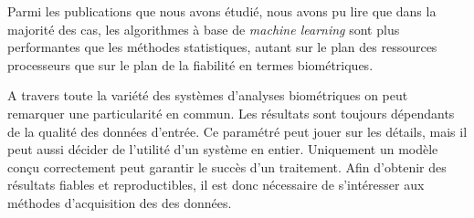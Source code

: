 Parmi les publications que nous avons étudié, nous avons pu lire que dans la majorité des cas, les algorithmes à base de \textit{machine learning} sont plus performantes que les méthodes statistiques, autant sur le plan des ressources processeurs\cite{Hu2008} que sur le plan de la fiabilité en termes biométriques\cite{giotBenchmark}.

A travers toute la variété des systèmes d'analyses biométriques on peut remarquer une particularité en commun. Les résultats sont toujours dépendants de la qualité des données d'entrée. Ce paramétré peut jouer sur les détails, mais il peut aussi décider de l'utilité d'un système en entier. Uniquement un modèle conçu correctement peut garantir le succès d'un traitement. Afin d'obtenir des résultats fiables et reproductibles, il est donc nécessaire de s'intéresser aux méthodes d'acquisition des des données.



